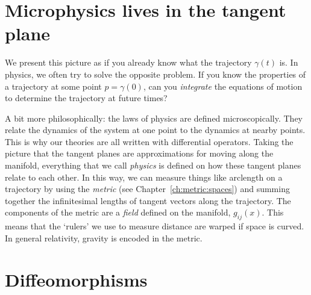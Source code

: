 \documentclass[12pt, oneside]{report}    %
\let\oldsection\section
\def\section{%
  \setcounter{sidenote}{1}%
  \oldsection
}
\begin{document}
\section{Microphysics lives in the tangent plane}

We present this picture as if you already know what the trajectory $\gamma(t)$ is. In physics, we often try to solve the opposite problem.  If you know the properties of a trajectory at some point $p=\gamma(0)$, can you \emph{integrate} the equations of motion to determine the trajectory at future times?

A bit more philosophically: the laws of physics are defined microscopically. They relate the dynamics of the system at one point to the dynamics at nearby points. This is why our theories are all written with differential operators. Taking the picture that the tangent planes are approximations for moving along the manifold, everything that we call \emph{physics} is defined on how these tangent planes relate to each other. In this way, we can measure things like arclength on a trajectory by using the \emph{metric} (see Chapter~\ref{ch:metric:spaces}) and summing together the infinitesimal lengths of tangent vectors along the trajectory. The components of the metric are a \emph{field} defined on the manifold, $g_{ij}(x)$. This means that the `rulers' we use to measure distance are warped if space is curved. In general relativity, gravity is encoded in the metric. 

\section{Diffeomorphisms}
\end{document}
